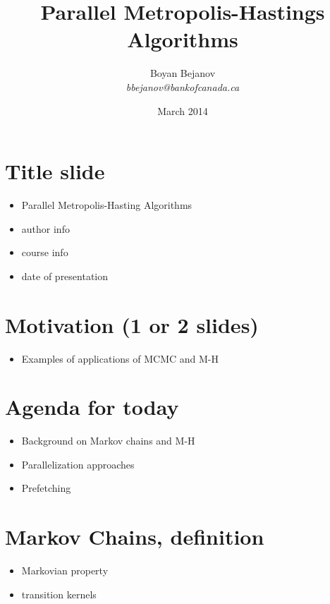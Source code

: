 \documentclass[11pt]{article}       %
\newenvironment{slide}[1]        {\section{#1} \begin{itemize}}%
                                 {\end{itemize}}
\begin{document}


\title{Parallel Metropolis-Hastings Algorithms}
\date{March 2014}

\author{
Boyan Bejanov\\
{\em bbejanov@bankofcanada.ca}
} %

\maketitle

\begin{slide}{Title slide}
\item Parallel Metropolis-Hasting Algorithms
\item author info
\item course info
\item date of presentation
\end{slide}

\begin{slide}{Motivation (1 or 2 slides)}
\item Examples of applications of MCMC and M-H
\end{slide}

\begin{slide}{Agenda for today}
\item Background on Markov chains and M-H
\item Parallelization approaches
\item Prefetching

\end{slide}

\begin{slide}{Markov Chains, definition}
\item Markovian property
\item transition kernels
\end{slide}
\end{document}
